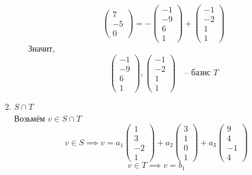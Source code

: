 \begin{enumerate}
\begin{enumerate}
$$\begin{pmatrix}
            7 \\
            -5 \\
            0
        \end{pmatrix} = -
        \begin{pmatrix}
        	-1 \\
            -9 \\
            6 \\
            1
        \end{pmatrix} +
        \begin{pmatrix}
        	-1 \\
            -2 \\
            1 \\
            1
        \end{pmatrix} $$
        Значит,
        $$
        \begin{pmatrix}
        	-1 \\
            -9 \\
            6 \\
            1
        \end{pmatrix},
        \begin{pmatrix}
        	-1 \\
            -2 \\
            1 \\
            1
        \end{pmatrix} \quad \text{-- базис } T $$
    \end{enumerate}
	\item $ S \cap T $ \\
    Возьмём $ v \in S \cap T $
    $$ v \in S \implies v = a_1
    \begin{pmatrix}
    	1 \\
        3 \\
        -2 \\
        1
    \end{pmatrix} + a_2
    \begin{pmatrix}
    	3 \\
        1 \\
        0 \\
        1
    \end{pmatrix} + a_3
    \begin{pmatrix}
    	9 \\
        4 \\
        -1 \\
        4
    \end{pmatrix} $$
    $$ v \in T \implies v = b_1
$$
\end{enumerate}
